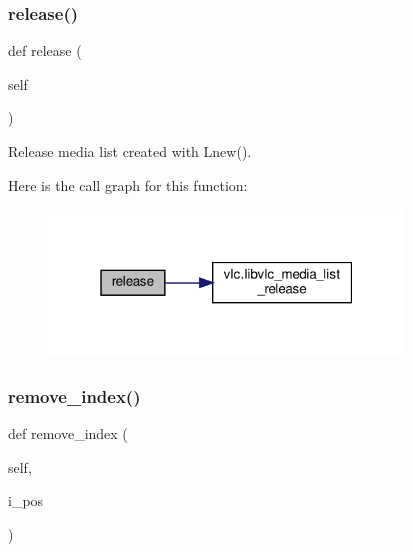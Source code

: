 \subsubsection{\texorpdfstring{release()}{release()}}
{\footnotesize\ttfamily def release (\begin{DoxyParamCaption}\item[{}]{self }\end{DoxyParamCaption})}

\begin{DoxyVerb}Release media list created with L{new}().
\end{DoxyVerb}
 Here is the call graph for this function\+:
\nopagebreak
\begin{figure}[H]
\begin{center}
\leavevmode
\includegraphics[width=268pt]{classvlc_1_1_media_list_a4cd51e19135e5ad4a19eae3ea9c60537_cgraph}
\end{center}
\end{figure}
\mbox{\label{classvlc_1_1_media_list_a44a92e05fc0eb945272ce4cf075779c5}} 
\subsubsection{\texorpdfstring{remove\+\_\+index()}{remove\_index()}}
{\footnotesize\ttfamily def remove\+\_\+index (\begin{DoxyParamCaption}\item[{}]{self,  }\item[{}]{i\+\_\+pos }\end{DoxyParamCaption})}

